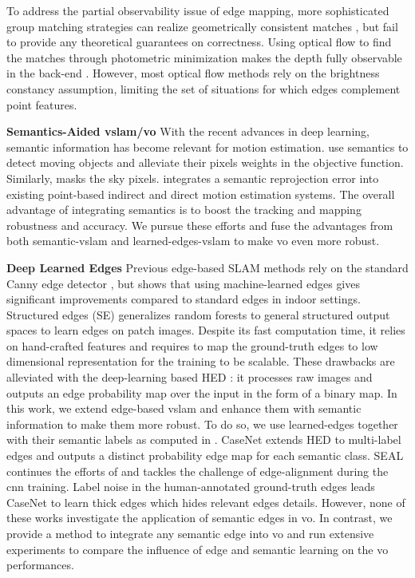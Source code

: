 To address the partial observability issue of edge mapping, more sophisticated group matching strategies can realize geometrically consistent matches \cite{tarrio2019se}, but fail to provide any theoretical guarantees on correctness. Using optical flow \cite{bouguet2001pyramidal} to find the matches through photometric minimization makes the depth fully observable in the back-end \cite{maity2017edge}. However, most optical flow methods rely on the brightness constancy assumption, limiting the set of situations for which edges complement point features. %

\noindent \textbf{Semantics-Aided \acrshort{vslam}/\acrshort{vo}} With the recent advances in deep learning, semantic information has become relevant for motion estimation.  \cite{yu2018ds} \cite{mahe2018semantic} use semantics to detect moving objects and alleviate their pixels weights in the objective function.  Similarly, \cite{kaneko2018mask} masks the sky pixels. \cite{lianos2018vso} integrates a semantic reprojection error into existing point-based indirect and direct motion estimation systems. The overall advantage of integrating semantics is to boost the tracking and mapping robustness and accuracy. We pursue these efforts and fuse the advantages from both semantic-\acrshort{vslam} and learned-edges-\acrshort{vslam} to make \acrshort{vo} even more robust.

\noindent \textbf{Deep Learned Edges} Previous edge-based SLAM methods rely on the standard Canny edge detector \cite{canny1987computational}, but \cite{schenk2017robust} shows that using machine-learned edges \cite{dollar2015fast} \cite{xie2015holistically} gives significant improvements compared to standard edges in indoor settings. Structured edges (SE) \cite{dollar2015fast} generalizes random forests to general structured output spaces to learn edges on patch images. Despite its fast computation time, it relies on hand-crafted features and requires to map the ground-truth edges to low dimensional representation for the training to be scalable. These drawbacks are alleviated with the deep-learning based HED \cite{xie2015holistically}: it processes raw images and outputs an edge probability map over the input in the form of a binary map. In this work, we extend edge-based \acrshort{vslam} and enhance them with semantic information to make them more robust. To do so, we use learned-edges together with their semantic labels as computed in \cite{yu2017casenet} \cite{yu2018simultaneous}.
CaseNet \cite{yu2017casenet} extends HED \cite{xie2015holistically} to multi-label edges and outputs a distinct probability edge map for each semantic class.  SEAL \cite{yu2018simultaneous} continues the efforts of \cite{yu2017casenet} and tackles the challenge of edge-alignment during the \acrshort{cnn} training. Label noise in the human-annotated ground-truth edges leads CaseNet to learn thick edges which hides relevant edges details. However, none of these works investigate the application of semantic edges in \acrshort{vo}. In contrast, we provide a method to integrate any semantic edge into \acrshort{vo} and run extensive experiments to compare the influence of edge and semantic learning on the \acrshort{vo} performances.
 
